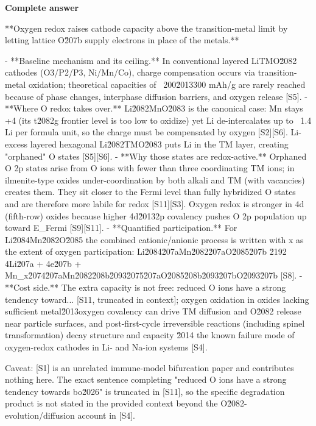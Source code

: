 \documentclass[10pt]{article}
\begin{document}
\textbf{Complete answer}
\begin{AnswerText}
**Oxygen redox raises cathode capacity above the transition-metal limit by letting lattice O\u207b supply electrons in place of the metals.**

- **Baseline mechanism and its ceiling.** In conventional layered LiTMO\u2082 cathodes (O3/P2/P3, Ni/Mn/Co), charge compensation occurs via transition-metal oxidation; theoretical capacities of ~200\u2013300 mAh/g are rarely reached because of phase changes, interphase diffusion barriers, and oxygen release [S5].
- **Where O redox takes over.** Li\u2082MnO\u2083 is the canonical case: Mn stays +4 (its t\u2082g frontier level is too low to oxidize) yet Li de-intercalates up to ~1.4 Li per formula unit, so the charge must be compensated by oxygen [S2][S6]. Li-excess layered hexagonal Li\u2082TMO\u2083 puts Li in the TM layer, creating "orphaned" O states [S5][S6].
- **Why those states are redox-active.** Orphaned O 2p states arise from O ions with fewer than three coordinating TM ions; in ilmenite-type oxides under-coordination by both alkali and TM (with vacancies) creates them. They sit closer to the Fermi level than fully hybridized O states and are therefore more labile for redox [S11][S3]. Oxygen redox is stronger in 4d (fifth-row) oxides because higher 4d\u20132p covalency pushes O 2p population up toward E_Fermi [S9][S11].
- **Quantified participation.** For Li\u2084Mn\u2082O\u2085 the combined cationic/anionic process is written with x as the extent of oxygen participation: Li\u2084\u207aMn\u2082\u207aO\u2085\u207b \u2192 4Li\u207a + 4e\u207b + Mn_x\u2074\u207aMn\u2082\u208b\u2093\u2075\u207aO\u2085\u208b\u2093\u207bO\u2093\u207b [S8].
- **Cost side.** The extra capacity is not free: reduced O ions have a strong tendency toward... [S11, truncated in context]; oxygen oxidation in oxides lacking sufficient metal\u2013oxygen covalency can drive TM diffusion and O\u2082 release near particle surfaces, and post-first-cycle irreversible reactions (including spinel transformation) decay structure and capacity \u2014 the known failure mode of oxygen-redox cathodes in Li- and Na-ion systems [S4].

Caveat: [S1] is an unrelated immune-model bifurcation paper and contributes nothing here. The exact sentence completing "reduced O ions have a strong tendency towards bo\u2026" is truncated in [S11], so the specific degradation product is not stated in the provided context beyond the O\u2082-evolution/diffusion account in [S4].
\end{AnswerText}
\end{document}
